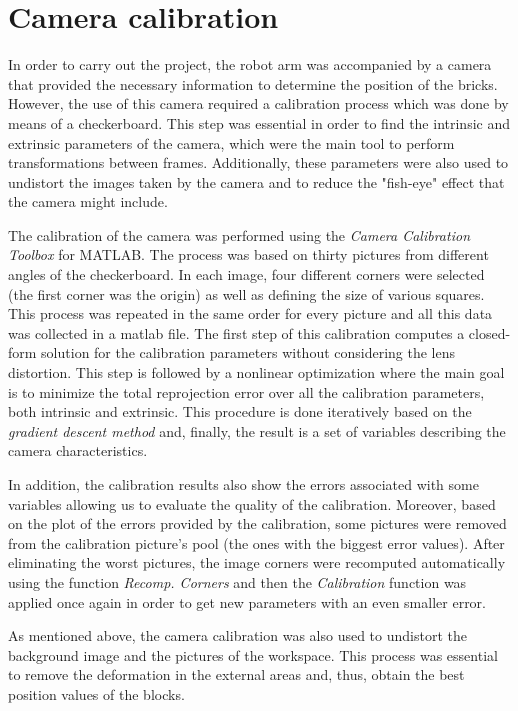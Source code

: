 \chapter{Camera calibration}\label{ch:calibration}

In order to carry out the project, the robot arm was accompanied by a camera that provided the necessary information to determine the position of the bricks. However, the use of this camera required a calibration process which was done by means of a checkerboard. This step was essential in order to find the intrinsic and extrinsic parameters of the camera, which were the main tool to perform transformations between frames. Additionally, these parameters were also used to undistort the images taken by the camera and to reduce the "fish-eye" effect that the camera might include.

The calibration of the camera was performed using the \textit{Camera Calibration Toolbox} for MATLAB. The process was based on thirty pictures from different angles of the checkerboard. In each image, four different corners were selected (the first corner was the origin) as well as defining the size of various squares. This process was repeated in the same order for every picture and all this data was collected in a matlab file. The first step of this calibration computes a closed-form solution for the calibration parameters without considering the lens distortion. This step is followed by a nonlinear optimization where the main goal is to minimize the total reprojection error over all the calibration parameters, both intrinsic and extrinsic. This procedure is done iteratively based on the \textit{gradient descent method} and, finally, the result is a set of variables describing the camera characteristics. 

In addition, the calibration results also show the errors associated with some variables allowing us to evaluate the quality of the calibration. Moreover, based on the plot of the errors provided by the calibration, some pictures were removed from the calibration picture's pool (the ones with the biggest error values). After eliminating the worst pictures, the image corners were recomputed automatically using the function \textit{Recomp. Corners} and then the \textit{Calibration} function was applied once again in order to get new parameters with an even smaller error.

As mentioned above, the camera calibration was also used to undistort the background image and the pictures of the workspace. This process was essential to remove the deformation in the external areas and, thus, obtain the best position values of the blocks. \par


